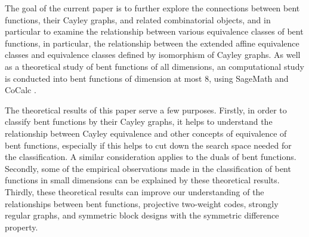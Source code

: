 \documentclass[12pt,a4paper]{article}
\begin{document}
The goal of the current paper is to further explore the connections between bent functions, their
Cayley graphs, and related combinatorial objects,
and in particular to examine the relationship between various equivalence classes of bent
functions, in particular, the relationship between the extended affine
equivalence classes and equivalence classes defined by isomorphism of Cayley graphs.
As well as a theoretical study of bent functions of all dimensions, an computational study is conducted
into bent functions of dimension at most 8,
using SageMath \cite{SageMath7517} and CoCalc \cite{SageMathCloud}.

The theoretical results of this paper serve a few purposes.
Firstly, in order to classify bent functions by their Cayley graphs,
it helps to understand the relationship between Cayley equivalence and other concepts of equivalence
of bent functions, especially if this helps to cut down the search space needed for the
classification.
A similar consideration applies to the duals of bent functions.
Secondly, some of the empirical observations made in the classification of bent functions in small
dimensions can be explained by these theoretical results.
Thirdly, these theoretical results can improve our understanding of the relationships between
bent functions, projective two-weight codes, strongly regular graphs, and
symmetric block designs with the symmetric difference property.
\end{document}
